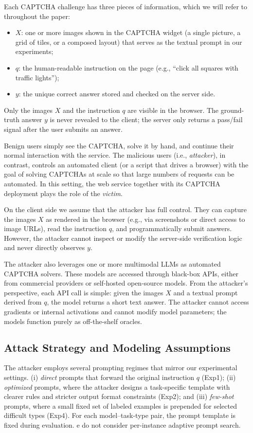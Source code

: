 \documentclass[sigconf, review]{acmart}
\begin{document}
Each CAPTCHA challenge has three pieces of information, which we will refer to throughout the paper:

\begin{itemize}
  \item $X$: one or more images shown in the CAPTCHA widget (a single picture, a grid of tiles, or a composed layout) that serves as the textual prompt in our experiments;
  \item $q$: the human-readable instruction on the page (e.g., ``click all squares with traffic lights'');
  \item $y$: the unique correct answer stored and checked on the server side.
\end{itemize}

Only the images $X$ and the instruction $q$ are visible in the browser. The ground-truth answer $y$ is never revealed to the client; the server only returns a pass/fail signal after the user submits an answer. 

Benign users simply see the CAPTCHA, solve it by hand, and continue their normal interaction with the service. The malicious users (i.e., \emph{attacker}), in contrast, controls an automated client (or a script that drives a browser) with the goal of solving CAPTCHAs at scale so that large numbers of requests can be automated. In this setting, the web service together with its CAPTCHA deployment plays the role of the \emph{victim}.

On the client side we assume that the attacker has full control. They can capture the images $X$ as rendered in the browser (e.g., via screenshots or direct access to image URLs), read the instruction $q$, and programmatically submit answers. However, the attacker cannot inspect or modify the server-side verification logic and never directly observes $y$.

The attacker also leverages one or more multimodal LLMs as automated CAPTCHA solvers. These models are accessed through black-box APIs, either from commercial providers or self-hosted open-source models. From the attacker’s perspective, each API call is simple: given the images $X$ and a textual prompt derived from $q$, the model returns a short text answer. The attacker cannot access gradients or internal activations and cannot modify model parameters; the models function purely as off-the-shelf oracles.

\subsection{Attack Strategy and Modeling Assumptions}
The attacker employs several prompting regimes that mirror our experimental settings. (i) \emph{direct} prompts that forward the original instruction $q$ (Exp1); (ii) \emph{optimized} prompts, where the attacker designs a task-specific template with clearer rules and stricter output format constraints (Exp2); and (iii) \emph{few-shot} prompts, where a small fixed set of labeled examples is prepended for selected difficult types (Exp4). For each model--task-type pair, the prompt template is fixed during evaluation. e do not consider per-instance adaptive prompt search.
\end{document}
